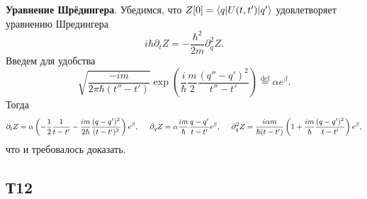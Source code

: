 \textbf{Уравнение Шрёдингера}. Убедимся, что $Z[0]=\bk{q}[U(t,t')]{q'}$ удовлетворяет уравнению Шредингера
\begin{equation*}
    i \hbar \partial_t Z = - \frac{\hbar^2}{2m} \partial_q^2 Z.
\end{equation*}
Введем для удобства
\begin{equation*}
    \sqrt{\frac{-i m}{2 \pi \hbar (t'' - t')}} \exp\left(
        \frac{i}{\hbar} \frac{m}{2} \frac{(q'' - q')^2}{t''-t'}
    \right) \overset{\mathrm{def}}{=}  \alpha e^{\beta}.
\end{equation*}
Тогда
\begin{align*}
    \partial_t Z = \alpha \left(- \frac{1}{2}\frac{1}{t-t'} - \frac{i m}{2 \hbar} \frac{(q-q')^2}{(t-t')^2} \right) e^\beta, 
    \hspace{5 mm} 
    \partial_q Z = \alpha \frac{i m}{\hbar} \frac{q-q'}{t-t'} e^\beta, 
    \hspace{5 mm} 
    \partial_q^2 Z = \frac{i \alpha m}{\hbar (t-t')} \left(
        1 + \frac{i m}{\hbar} \frac{(q-q')^2}{t-t'}
    \right)e^\beta,
\end{align*}
что и требовалось доказать.



\subsection*{Т12}

